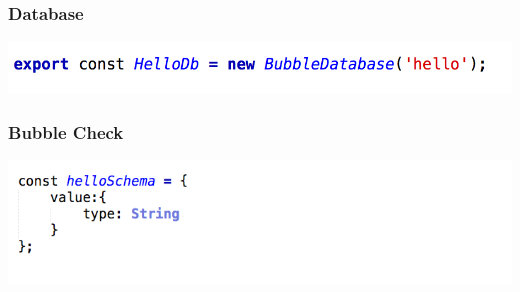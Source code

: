 \begin{frame}
  \frametitle{Database}
  \begin{center}
    \includegraphics[width=.8\textwidth]{code/helloDb.png}
  \end{center}
\end{frame}

\begin{frame}
  \frametitle{Bubble Check}
  \begin{center}
    \includegraphics[width=.8\textwidth]{code/hellocheck.png}
  \end{center}
\end{frame}
